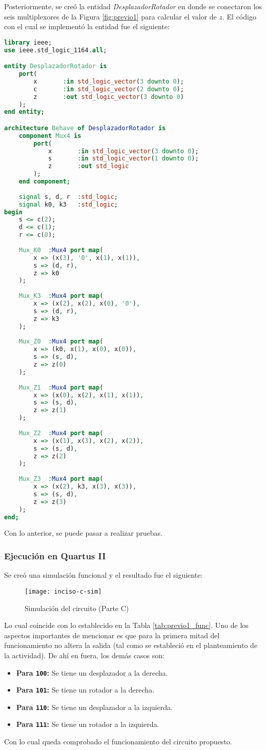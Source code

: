 \documentclass[../procedimientos.tex]{subfiles}
\begin{document}
Posteriormente, se creó la entidad \textit{DesplazadorRotador} en donde se 
conectaron los seis multiplexores de la Figura \ref{fig:previo1} para calcular 
el valor de $z$. El código con el cual se implementó la entidad fue el 
siguiente:
\begin{lstlisting}[language=VHDL]
library ieee;
use ieee.std_logic_1164.all;

entity DesplazadorRotador is
	port(
		x		:in std_logic_vector(3 downto 0);
		c		:in std_logic_vector(2 downto 0);
		z		:out std_logic_vector(3 downto 0)
	);
end entity;

architecture Behave of DesplazadorRotador is
	component Mux4 is
		port(
			x		:in std_logic_vector(3 downto 0);
			s		:in std_logic_vector(1 downto 0);
			z		:out std_logic
		);
	end component;
	
	signal s, d, r	:std_logic;
	signal k0, k3	:std_logic;
begin
	s <= c(2);
	d <= c(1);
	r <= c(0);
	
	Mux_K0	:Mux4 port map(
		x => (x(3), '0', x(1), x(1)),
		s => (d, r),
		z => k0
	);
	
	Mux_K3	:Mux4 port map(
		x => (x(2), x(2), x(0), '0'),
		s => (d, r),
		z => k3
	);
	
	Mux_Z0	:Mux4 port map(
		x => (k0, x(1), x(0), x(0)),
		s => (s, d),
		z => z(0)
	);
	
	Mux_Z1	:Mux4 port map(
		x => (x(0), x(2), x(1), x(1)),
		s => (s, d),
		z => z(1)
	);
	
	Mux_Z2	:Mux4 port map(
		x => (x(1), x(3), x(2), x(2)),
		s => (s, d),
		z => z(2)
	);
	
	Mux_Z3	:Mux4 port map(
		x => (x(2), k3, x(3), x(3)),
		s => (s, d),
		z => z(3)
	);
end;
\end{lstlisting}

Con lo anterior, se puede pasar a realizar pruebas.

\subsubsection*{Ejecución en Quartus II}
Se creó una simulación funcional y el resultado fue el siguiente:
\begin{figure}[H]
  \centering
  \texttt{[image: inciso-c-sim]}
  \caption{Simulación del circuito (Parte C)}
  \label{fig:inciso_c_sim}
\end{figure}

Lo cual coincide con lo establecido en la Tabla \ref{tab:previo1_func}. Uno de 
los aspectos importantes de mencionar es que para la primera mitad del 
funcionamiento no altera la salida (tal como se estableció en el planteamiento 
de la actividad). De ahí en fuera, los demás casos son:
\begin{itemize}
  \item \textbf{Para \texttt{100}:} Se tiene un desplazador a la derecha.
  \item \textbf{Para \texttt{101}:} Se tiene un rotador a la derecha.
  \item \textbf{Para \texttt{110}:} Se tiene un desplazador a la izquierda.
  \item \textbf{Para \texttt{111}:} Se tiene un rotador a la izquierda.
\end{itemize}

Con lo cual queda comprobado el funcionamiento del circuito propuesto.
\end{document}
